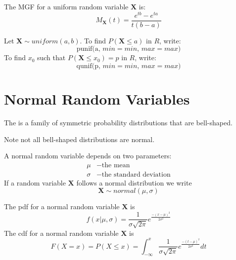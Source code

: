 \documentclass[12pt]{report}
\begin{document}
\begin{defn}{}{}
    The MGF for a uniform random variable $\mathbf{X}$ is: \begin{equation*}
        M_{\mathbf{X}}(t) = \frac{e^{tb}-e^{ta}}{t(b-a)}
    \end{equation*}
\end{defn}


\begin{defn}{}{}
    Let $\mathbf{X}\sim uniform(a,b)$. To find $P(\mathbf{X} \leq a)$ in $R$, write: \begin{equation*}
        \text{punif(a, $min = min$, $max = max$)}
    \end{equation*}
    To find $x_0$ such that $P(\mathbf{X} \leq x_0) = p$ in $R$, write: \begin{equation*}
        \text{qunif(p, $min = min$, $max = max$)}
    \end{equation*}
\end{defn}



\section{Normal Random Variables}

\begin{defn}{}{}
    The  is a family of symmetric probability distributions that are bell-shaped.
\end{defn}

Note not all bell-shaped distributions are normal.


\begin{defn}{}{}
    A normal random variable depends on two parameters: \begin{align*}
        \mu &- \text{the mean} \\
        \sigma &- \text{the standard deviation}
    \end{align*}
    If a random variable $\mathbf{X}$ follows a normal distribution we write $$\mathbf{X}\sim normal(\mu,\sigma)$$
\end{defn}

\begin{defn}{}{}
    The pdf for a normal random variable $\mathbf{X}$ is \begin{equation*}
        f(x\vert\mu,\sigma) = \frac{1}{\sigma\sqrt{2\pi}}e^{\frac{-(x-\mu)^2}{2\sigma^2}}
    \end{equation*}
    The cdf for a normal random variable $\mathbf{X}$ is \begin{equation*}
        F(X = x) = P(X\leq x) = \int_{-\infty}^x\frac{1}{\sigma\sqrt{2\pi}}e^{\frac{-(t-\mu)^2}{2\sigma^2}}dt
    \end{equation*}
\end{defn}
\end{document}
